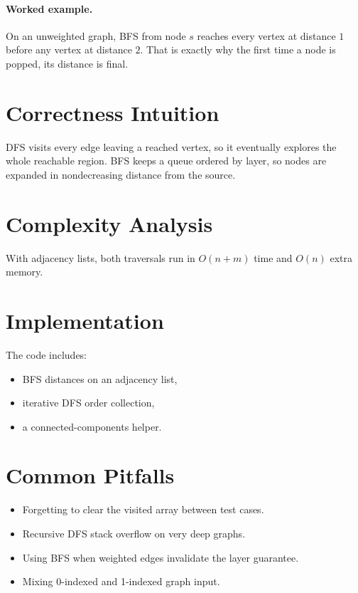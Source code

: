 \paragraph{Worked example.}
On an unweighted graph, BFS from node \(s\) reaches every vertex at distance \(1\) before any vertex at distance \(2\).
That is exactly why the first time a node is popped, its distance is final.

\section*{Correctness Intuition}

DFS visits every edge leaving a reached vertex, so it eventually explores the whole reachable region. BFS keeps a queue
ordered by layer, so nodes are expanded in nondecreasing distance from the source.

\section*{Complexity Analysis}

With adjacency lists, both traversals run in \(O(n + m)\) time and \(O(n)\) extra memory.

\section*{Implementation}

The code includes:

\begin{itemize}
  \item BFS distances on an adjacency list,
  \item iterative DFS order collection,
  \item a connected-components helper.
\end{itemize}

\section*{Common Pitfalls}

\begin{itemize}
  \item Forgetting to clear the visited array between test cases.
  \item Recursive DFS stack overflow on very deep graphs.
  \item Using BFS when weighted edges invalidate the layer guarantee.
  \item Mixing 0-indexed and 1-indexed graph input.
\end{itemize}


